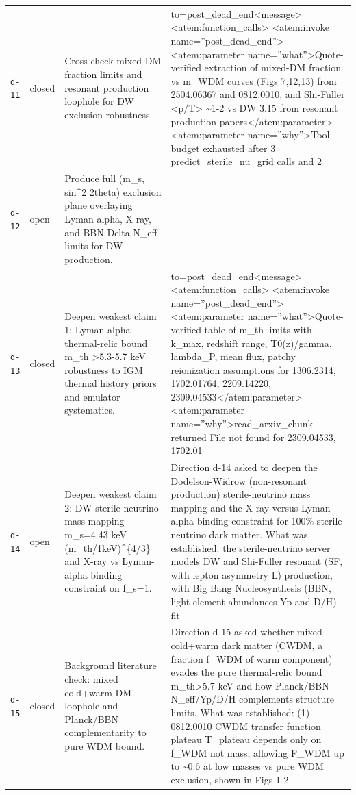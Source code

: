 \documentclass[11pt,a4paper]{article}
\begin{document}
\begin{longtable}{@{}p{}p{}p{}p{}@{}}
\texttt{d-11} & closed & Cross-check mixed-DM fraction limits and resonant production loophole for DW exclusion robustness & to=post\_dead\_end\textless{}\textbar{}message\textbar{}\textgreater{}\textless{}atem:function\_calls\textgreater{}
\textless{}atem:invoke name=''post\_dead\_end''\textgreater{}
\textless{}atem:parameter name=''what''\textgreater{}Quote-verified extraction of mixed-DM fraction vs m\_WDM curves (Figs 7,12,13) from 2504.06367 and 0812.0010, and Shi-Fuller \textless{}p/T\textgreater{} \textasciitilde{}1-2 vs DW 3.15 from resonant production papers\textless{}/atem:parameter\textgreater{}
\textless{}atem:parameter name=''why''\textgreater{}Tool budget exhausted after 3 predict\_sterile\_nu\_grid calls and 2  \\
\texttt{d-12} & open & Produce full (m\_s, sin\textasciicircum{}2 2theta) exclusion plane overlaying Lyman-alpha, X-ray, and BBN Delta N\_eff limits for DW production. &  \\
\texttt{d-13} & closed & Deepen weakest claim 1: Lyman-alpha thermal-relic bound m\_th \textgreater{}5.3-5.7 keV robustness to IGM thermal history priors and emulator systematics. & to=post\_dead\_end\textless{}\textbar{}message\textbar{}\textgreater{}\textless{}atem:function\_calls\textgreater{}
\textless{}atem:invoke name=''post\_dead\_end''\textgreater{}
\textless{}atem:parameter name=''what''\textgreater{}Quote-verified table of m\_th limits with k\_max, redshift range, T0(z)/gamma, lambda\_P, mean flux, patchy reionization assumptions for 1306.2314, 1702.01764, 2209.14220, 2309.04533\textless{}/atem:parameter\textgreater{}
\textless{}atem:parameter name=''why''\textgreater{}read\_arxiv\_chunk returned File not found for 2309.04533, 1702.01 \\
\texttt{d-14} & open & Deepen weakest claim 2: DW sterile-neutrino mass mapping m\_s=4.43 keV (m\_th/1keV)\textasciicircum{}\{4/3\} and X-ray vs Lyman-alpha binding constraint on f\_s=1. & Direction d-14 asked to deepen the Dodelson-Widrow (non-resonant production) sterile-neutrino mass mapping and the X-ray versus Lyman-alpha binding constraint for 100\% sterile-neutrino dark matter. What was established: the sterile-neutrino server models DW and Shi-Fuller resonant (SF, with lepton asymmetry L) production, with Big Bang Nucleosynthesis (BBN, light-element abundances Yp and D/H) fit \\
\texttt{d-15} & closed & Background literature check: mixed cold+warm DM loophole and Planck/BBN complementarity to pure WDM bound. & Direction d-15 asked whether mixed cold+warm dark matter (CWDM, a fraction f\_WDM of warm component) evades the pure thermal-relic bound m\_th\textgreater{}5.7 keV and how Planck/BBN N\_eff/Yp/D/H complements structure limits. What was established: (1) 0812.0010 CWDM transfer function plateau T\_plateau depends only on f\_WDM not mass, allowing F\_WDM up to \textasciitilde{}0.6 at low masses vs pure WDM exclusion, shown in Figs 1-2 \\

\end{longtable}
\end{document}
